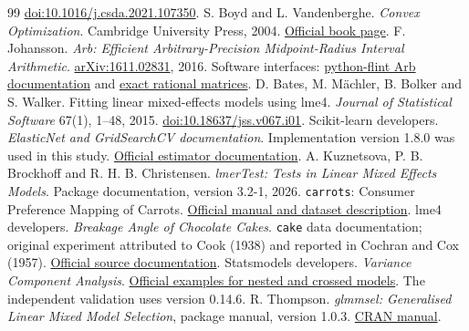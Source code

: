 \documentclass[preprint,11pt,numbers]{elsarticle}
\theoremstyle{remark}\newtheorem{remark}[theorem]{Remark}
\begin{document}
\begin{thebibliography}{99}
\href{https://doi.org/10.1016/j.csda.2021.107350}{doi:10.1016/j.csda.2021.107350}.
 S. Boyd and L. Vandenberghe.
\emph{Convex Optimization}. Cambridge University Press, 2004.
\href{https://web.stanford.edu/~boyd/cvxbook/}{Official book page}.
 F. Johansson.
\emph{Arb: Efficient Arbitrary-Precision Midpoint-Radius Interval Arithmetic}.
\href{https://arxiv.org/abs/1611.02831}{arXiv:1611.02831}, 2016.
Software interfaces: \href{https://python-flint.readthedocs.io/en/latest/arb.html}{python-flint Arb documentation}
and \href{https://python-flint.readthedocs.io/en/latest/fmpq_mat.html}{exact rational matrices}.
 D. Bates, M. M\"achler, B. Bolker and S. Walker.
Fitting linear mixed-effects models using lme4.
\emph{Journal of Statistical Software} 67(1), 1--48, 2015.
\href{https://doi.org/10.18637/jss.v067.i01}{doi:10.18637/jss.v067.i01}.
 Scikit-learn developers.
\emph{ElasticNet and GridSearchCV documentation}. Implementation version 1.8.0
was used in this study.
\href{https://scikit-learn.org/stable/modules/generated/sklearn.linear_model.ElasticNet.html}{Official estimator documentation}.
 A. Kuznetsova, P. B. Brockhoff and R. H. B. Christensen.
\emph{lmerTest: Tests in Linear Mixed Effects Models}. Package documentation,
version 3.2-1, 2026. \texttt{carrots}: Consumer Preference Mapping of Carrots.
\href{https://cran.r-project.org/web/packages/lmerTest/lmerTest.pdf}{Official manual and dataset description}.
 lme4 developers. \emph{Breakage Angle of Chocolate Cakes}.
\texttt{cake} data documentation; original experiment attributed to Cook (1938)
and reported in Cochran and Cox (1957).
\href{https://github.com/lme4/lme4/blob/master/man/cake.Rd}{Official source documentation}.
 Statsmodels developers. \emph{Variance Component Analysis}.
\href{https://www.statsmodels.org/stable/examples/notebooks/generated/variance_components.html}{Official examples for nested and crossed models}.
The independent validation uses version 0.14.6.
 R. Thompson. \emph{glmmsel: Generalised Linear Mixed
Model Selection}, package manual, version 1.0.3.
\href{https://cran.r-project.org/web/packages/glmmsel/glmmsel.pdf}{CRAN manual}.
\end{thebibliography}
\end{document}
